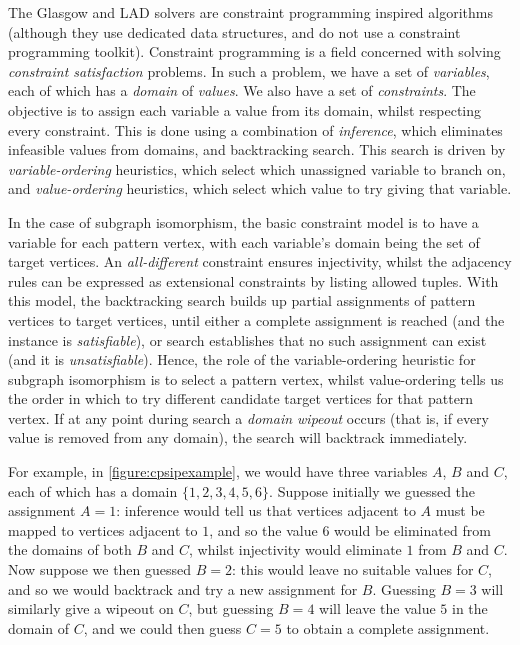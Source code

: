 \documentclass[twoside,11pt]{article}
\begin{document}
The Glasgow and LAD solvers are constraint programming inspired algorithms (although they use
dedicated data structures, and do not use a constraint programming toolkit). Constraint programming
is a field concerned with solving \emph{constraint satisfaction} problems. In such a problem, we
have a set of \emph{variables}, each of which has a \emph{domain} of \emph{values}. We also have a
set of \emph{constraints}. The objective is to assign each variable a value from its domain, whilst
respecting every constraint. This is done using a combination of \emph{inference}, which eliminates
infeasible values from domains, and backtracking search. This search is driven by
\emph{variable-ordering} heuristics, which select which unassigned variable to branch on, and
\emph{value-ordering} heuristics, which select which value to try giving that variable.

In the case of subgraph isomorphism, the basic constraint model is to have a variable for each
pattern vertex, with each variable's domain being the set of target vertices. An
\emph{all-different} constraint ensures injectivity, whilst the adjacency rules can be expressed as
extensional constraints by listing allowed tuples.  With this model, the backtracking search builds
up partial assignments of pattern vertices to target vertices, until either a complete assignment is
reached (and the instance is \emph{satisfiable}), or search establishes that no such assignment can
exist (and it is \emph{unsatisfiable}).  Hence, the role of the variable-ordering heuristic for
subgraph isomorphism is to select a pattern vertex, whilst value-ordering tells us the order in
which to try different candidate target vertices for that pattern vertex. If at any point during
search a \emph{domain wipeout} occurs (that is, if every value is removed from any domain), the
search will backtrack immediately.

For example, in \cref{figure:cpsipexample}, we would have three variables $A$, $B$ and $C$, each of
which has a domain $\{1, 2, 3, 4, 5, 6\}$. Suppose initially we guessed the assignment $A = 1$:
inference would tell us that vertices adjacent to $A$ must be mapped to vertices adjacent to $1$,
and so the value $6$ would be eliminated from the domains of both $B$ and $C$, whilst injectivity
would eliminate $1$ from $B$ and $C$. Now suppose we then guessed $B = 2$: this would leave no
suitable values for $C$, and so we would backtrack and try a new assignment for $B$. Guessing $B =
3$ will similarly give a wipeout on $C$, but guessing $B = 4$ will leave the value $5$ in the domain
of $C$, and we could then guess $C = 5$ to obtain a complete assignment.
\end{document}
